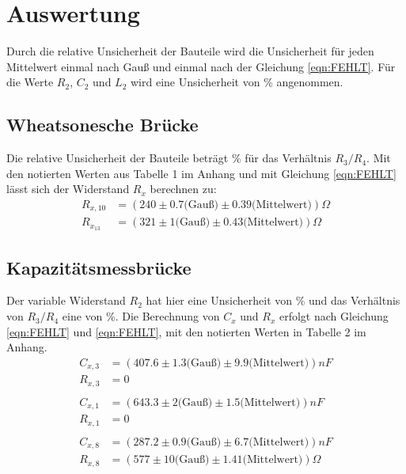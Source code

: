 \section{Auswertung}
\label{sec:Auswertung}

Durch die relative Unsicherheit der Bauteile wird die Unsicherheit für jeden Mittelwert einmal nach Gauß und einmal nach der Gleichung \ref{eqn:FEHLT}.
Für die Werte $R_2$, $C_2$ und $L_2$ wird eine Unsicherheit von \% angenommen.

\subsection{Wheatsonesche Brücke}
\label{sec:Weed}
Die relative Unsicherheit der Bauteile beträgt \% für das Verhältnis $R_3/R_4$.
Mit den notierten Werten aus Tabelle 1 im Anhang und mit Gleichung \ref{eqn:FEHLT} lässt sich der Widerstand $R_x$ berechnen zu:
\begin{align}
  R_{x,10} &= (240 \pm 0.7 \textrm{(Gauß)} \pm 0.39 \textrm{(Mittelwert)}) \Omega \\
  R_{x_13} &= (321 \pm 1 \textrm{(Gauß)} \pm 0.43 \textrm{(Mittelwert)}) \Omega
\end{align}

\subsection{Kapazitätsmessbrücke}
\label{sec:Kapazitaet}
Der variable Widerstand $R_2$ hat hier eine Unsicherheit von \% und das Verhältnis von $R_3/R_4$ eine von \%.
Die Berechnung von $C_x$ und $R_x$ erfolgt nach Gleichung \ref{eqn:FEHLT} und \ref{eqn:FEHLT}, mit den notierten Werten in Tabelle 2 im Anhang.
\begin{align}
  C_{x,3} &= (407.6 \pm 1.3 \textrm{(Gauß)} \pm 9.9 \textrm{(Mittelwert)}) nF \\
  R_{x,3} &= 0\\
  \\
  C_{x,1} &= (643.3 \pm 2 \textrm{(Gauß)} \pm 1.5 \textrm{(Mittelwert)}) nF \\
  R_{x,1} &= 0\\
  \\
  C_{x,8} &= (287.2 \pm 0.9 \textrm{(Gauß)} \pm 6.7 \textrm{(Mittelwert)}) nF \\
  R_{x,8} &= (577 \pm 10 \textrm{(Gauß)} \pm 1.41 \textrm{(Mittelwert)}) \Omega
\end{align}

